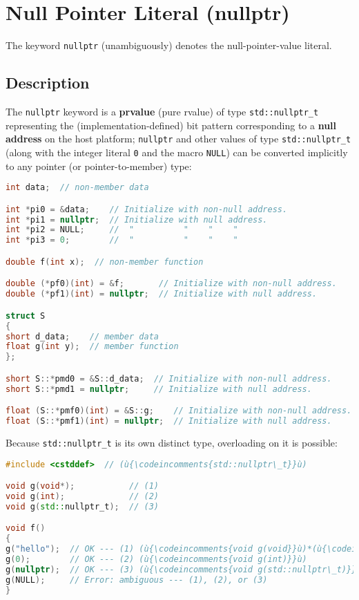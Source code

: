 \newpage
\section[Null Pointer Literal (\tt{nullptr})]{Null Pointer Literal ({\SecCode nullptr})}\label{null-pointer-literal-(nullptr)}


The keyword \texttt{nullptr} (unambiguously) denotes the
null-pointer-value literal.

\subsection[Description]{Description}\label{description}

The \texttt{nullptr} keyword is a \textbf{prvalue} (pure rvalue) of type
\texttt{std::nullptr\_t} representing the (implementation-defined)
bit pattern corresponding to a \textbf{null address} on the host platform;
\texttt{nullptr} and other values of type \texttt{std::nullptr\_t}
(along with the integer literal \texttt{0} and the macro \texttt{NULL})
can be converted implicitly to any pointer (or pointer-to-member) type:

\begin{lstlisting}[language=C++]
int data;  // non-member data

int *pi0 = &data;    // Initialize with non-null address.
int *pi1 = nullptr;  // Initialize with null address.
int *pi2 = NULL;     //  "          "    "    "
int *pi3 = 0;        //  "          "    "    "

double f(int x);  // non-member function

double (*pf0)(int) = &f;       // Initialize with non-null address.
double (*pf1)(int) = nullptr;  // Initialize with null address.

struct S
{
short d_data;    // member data
float g(int y);  // member function
};

short S::*pmd0 = &S::d_data;  // Initialize with non-null address.
short S::*pmd1 = nullptr;     // Initialize with null address.

float (S::*pmf0)(int) = &S::g;    // Initialize with non-null address.
float (S::*pmf1)(int) = nullptr;  // Initialize with null address.
\end{lstlisting}


\noindent Because \texttt{std::nullptr\_t} is its own distinct type, overloading on
it is possible:

\begin{lstlisting}[language=C++]
#include <cstddef>  // (ù{\codeincomments{std::nullptr\_t}}ù)

void g(void*);           // (1)
void g(int);             // (2)
void g(std::nullptr_t);  // (3)

void f()
{
g("hello");  // OK --- (1) (ù{\codeincomments{void g(void}}ù)*(ù{\codeincomments{)}}ù)
g(0);        // OK --- (2) (ù{\codeincomments{void g(int)}}ù)
g(nullptr);  // OK --- (3) (ù{\codeincomments{void g(std::nullptr\_t)}}ù)
g(NULL);     // Error: ambiguous --- (1), (2), or (3)
}
\end{lstlisting}


